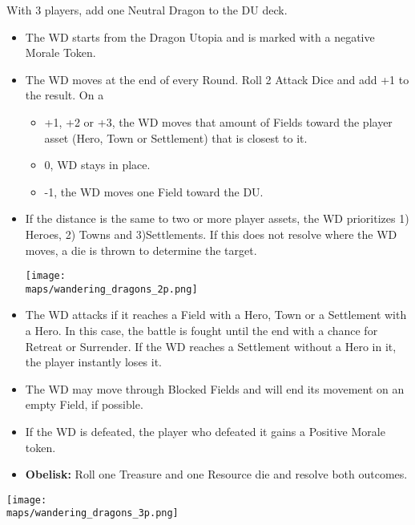 \begin{multicols*}{2}
With 3 players, add one \golden Neutral Dragon to the DU deck.

\begin{itemize}
  \item The WD starts from the Dragon Utopia and is marked with a negative Morale Token.
  \item The WD moves at the end of every Round. Roll 2 Attack Dice and add +1 to the result. On a 
  \begin{itemize}
    \item +1, +2 or +3, the WD moves that amount of Fields toward the player asset (Hero, Town or Settlement) that is closest to it.
    \item 0, WD stays in place.
    \item -1, the WD moves one Field toward the DU.
  \end {itemize}
  \item If the distance is the same to two or more player assets, the WD prioritizes 1) Heroes, 2) Towns and 3)Settlements. If this does not resolve where the WD moves, a die is thrown to determine the target.


\begin{center}
  \texttt{[image: \\maps/wandering\_dragons\_2p.png]}
\end{center}

\columnbreak

  \item The WD attacks if it reaches a Field with a Hero, Town or a Settlement with a Hero. In this case, the battle is fought until the end with a chance for Retreat or Surrender. If the WD reaches a Settlement without a Hero in it, the player instantly loses it.
  \item The WD may move through Blocked Fields and will end its movement on an empty Field, if possible.
  \item If the WD is defeated, the player who defeated it gains a Positive Morale token.
  \item \textbf{Obelisk:} Roll one Treasure and one Resource die and resolve both outcomes.
\end{itemize}

\begin{center}
  \vspace*{\fill}
  \texttt{[image: \\maps/wandering\_dragons\_3p.png]}
  \vspace*{\fill}
\end{center}

\end{multicols*}